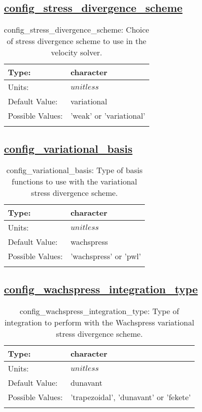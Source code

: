 \subsection[config\_stress\_divergence\_scheme]{\hyperref[sec:nm_tab_velocity_solver]{config\_stress\_divergence\_scheme}}
\label{subsec:nm_sec_config_stress_divergence_scheme}
\begin{center}
\begin{longtable}{| p{2.0in} || p{4.0in} |}
    \hline
    Type: & character \\
    \hline
    Units: & $unitless$ \\
    \hline
    Default Value: & variational \\
    \hline
    Possible Values: & 'weak' or 'variational' \\
    \hline
    \caption{config\_stress\_divergence\_scheme: Choice of stress divergence scheme to use in the velocity solver.}
\end{longtable}
\end{center}
\subsection[config\_variational\_basis]{\hyperref[sec:nm_tab_velocity_solver]{config\_variational\_basis}}
\label{subsec:nm_sec_config_variational_basis}
\begin{center}
\begin{longtable}{| p{2.0in} || p{4.0in} |}
    \hline
    Type: & character \\
    \hline
    Units: & $unitless$ \\
    \hline
    Default Value: & wachspress \\
    \hline
    Possible Values: & 'wachspress' or 'pwl' \\
    \hline
    \caption{config\_variational\_basis: Type of basis functions to use with the variational stress divergence scheme.}
\end{longtable}
\end{center}
\subsection[config\_wachspress\_integration\_type]{\hyperref[sec:nm_tab_velocity_solver]{config\_wachspress\_integration\_type}}
\label{subsec:nm_sec_config_wachspress_integration_type}
\begin{center}
\begin{longtable}{| p{2.0in} || p{4.0in} |}
    \hline
    Type: & character \\
    \hline
    Units: & $unitless$ \\
    \hline
    Default Value: & dunavant \\
    \hline
    Possible Values: & 'trapezoidal', 'dunavant' or 'fekete' \\
    \hline
    \caption{config\_wachspress\_integration\_type: Type of integration to perform with the Wachspress variational stress divergence scheme.}
\end{longtable}
\end{center}
